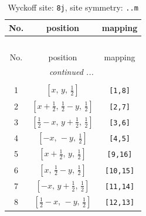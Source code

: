 \documentclass[fleqn,8pt]{jsarticle}
\begin{document}
\begin{longtable}{ccc}
\caption{Wyckoff site: {\tt 8j}, site symmetry: {\tt ..m}}
 \\
 \hline \hline
No. & position & mapping \\ \hline \endfirsthead

\multicolumn{2}{l}{\tablename\ \thetable{}} \\
 \hline \hline
No. & position & mapping \\ \hline \endhead

 \hline \hline
\multicolumn{2}{r}{\footnotesize\it continued ...} \\ \endfoot

 \hline \hline
\multicolumn{2}{r}{} \\ \endlastfoot

1 & $\left[ x,\, y,\, \frac{1}{2} \right]$ & {\tt [1,8]} \\ \hline
2 & $\left[ x + \frac{1}{2},\, \frac{1}{2} - y,\, \frac{1}{2} \right]$ & {\tt [2,7]} \\ \hline
3 & $\left[ \frac{1}{2} - x,\, y + \frac{1}{2},\, \frac{1}{2} \right]$ & {\tt [3,6]} \\ \hline
4 & $\left[ - x,\, - y,\, \frac{1}{2} \right]$ & {\tt [4,5]} \\ \hline
5 & $\left[ x + \frac{1}{2},\, y,\, \frac{1}{2} \right]$ & {\tt [9,16]} \\ \hline
6 & $\left[ x,\, \frac{1}{2} - y,\, \frac{1}{2} \right]$ & {\tt [10,15]} \\ \hline
7 & $\left[ - x,\, y + \frac{1}{2},\, \frac{1}{2} \right]$ & {\tt [11,14]} \\ \hline
8 & $\left[ \frac{1}{2} - x,\, - y,\, \frac{1}{2} \right]$ & {\tt [12,13]} \\
\end{longtable}
\renewcommand{\arraystretch}{1.2}
\end{document}
